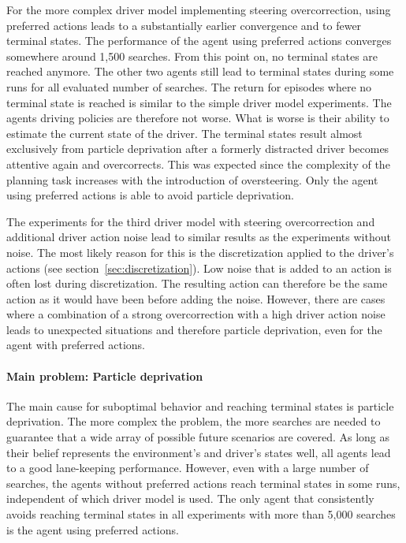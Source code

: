 For the more complex driver model implementing steering overcorrection, using preferred actions leads to a substantially earlier convergence and to fewer terminal states. The performance of the agent using preferred actions converges somewhere around 1,500 searches. From this point on, no terminal states are reached anymore. The other two agents still lead to terminal states during some runs for all evaluated number of searches. The return for episodes where no terminal state is reached is similar to the simple driver model experiments. The agents driving policies are therefore not worse. What is worse is their ability to estimate the current state of the driver. The terminal states result almost exclusively from particle deprivation after a formerly distracted driver becomes attentive again and overcorrects. This was expected since the complexity of the planning task increases with the introduction of oversteering. Only the agent using preferred actions is able to avoid particle deprivation.

The experiments for the third driver model with steering overcorrection and additional driver action noise lead to similar results as the experiments without noise. The most likely reason for this is the discretization applied to the driver's actions (see section~\ref{sec:discretization}). Low noise that is added to an action is often lost during discretization. The resulting action can therefore be the same action as it would have been before adding the noise. However, there are cases where a combination of a strong overcorrection with a high driver action noise leads to unexpected situations and therefore particle deprivation, even for the agent with preferred actions.

\paragraph{Main problem: Particle deprivation}

The main cause for suboptimal behavior and reaching terminal states is particle deprivation. The more complex the problem, the more searches are needed to guarantee that a wide array of possible future scenarios are covered. As long as their belief represents the environment's and driver's states well, all agents lead to a good lane-keeping performance. However, even with a large number of searches, the agents without preferred actions reach terminal states in some runs, independent of which driver model is used. The only agent that consistently avoids reaching terminal states in all experiments with more than 5,000 searches is the agent using preferred actions. 

